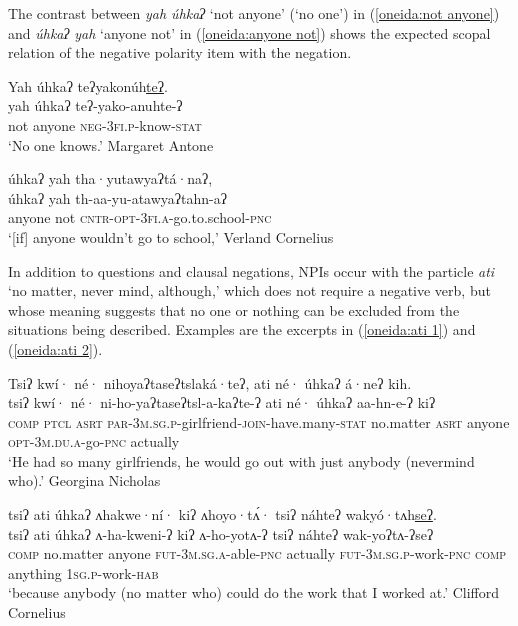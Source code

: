 \documentclass[output=paper,colorlinks,citecolor=brown]{langscibook}
\begin{document}
The contrast between \textit{yah úhkaʔ} `not anyone' (`no one') in (\ref{oneida:not anyone}) and \textit{úhkaʔ yah} `anyone not' in (\ref{oneida:anyone not}) shows the expected scopal relation of the negative polarity item with the negation.

\ea\label{oneida:not anyone}
    \glll Yah úhkaʔ teʔyakonúh\uline{teʔ}. \\
    yah úhkaʔ teʔ-yako-anuhte-ʔ \\
    not anyone \textsc{neg-3fi.p}-know-\textsc{stat} \\
    \glt `No one knows.' Margaret Antone \citep[177 (47)]{MichelsonEtAl2016}
\z

\ea\label{oneida:anyone not}
    \glll úhkaʔ yah tha·yutawyaʔtá·naʔ, \\
    úhkaʔ yah th-aa-yu-atawyaʔtahn-aʔ \\
    anyone not \textsc{cntr-opt-3fi.a}-go.to.school-\textsc{pnc} \\
    \glt `[if] anyone wouldn't go to school,' Verland Cornelius \citep[328 (160)]{MichelsonEtAl2016}
\z

In addition to questions and clausal negations, NPIs occur with the particle \textit{ati} `no matter, never mind, although,' which does not require a negative verb, but whose meaning suggests that no one or nothing can be excluded from the situations being described. Examples are the excerpts in (\ref{oneida:ati 1}) and (\ref{oneida:ati 2}).

\ea\label{oneida:ati 1}	
    \glll Tsiʔ kwí· né· nihoyaʔtaseʔtslaká·teʔ, ati né· úhkaʔ á·neʔ kih. \\
    tsiʔ kwí· né· ni-ho-yaʔtaseʔtsl-a-kaʔte-ʔ ati né· úhkaʔ aa-hn-e-ʔ kiʔ \\
    \textsc{comp} \textsc{ptcl} \textsc{asrt} \textsc{par-3m.sg.p}-girlfriend-\textsc{join}-have.many-\textsc{stat} {no.matter} \textsc{asrt} anyone \textsc{opt-3m.du.a}-go-\textsc{pnc} actually \\ 
    \glt `He had so many girlfriends, he would go out with just anybody (nevermind who).' Georgina Nicholas \citep[32 (6)]{MichelsonEtAl2016}
\z

\ea\label{oneida:ati 2}	
    \glll tsiʔ ati úhkaʔ ʌhakwe·ní· kiʔ ʌhoyo·tʌ́· tsiʔ náhteʔ waky\'o·tʌh\uline{seʔ}. \\
    tsiʔ ati úhkaʔ ʌ-ha-kweni-ʔ kiʔ ʌ-ho-yotʌ-ʔ tsiʔ náhteʔ wak-yo{ʔ}tʌ-{ʔ}seʔ \\
    \textsc{comp} {no.matter} anyone \textsc{fut-3m.sg.a}-able-\textsc{pnc} actually \textsc{fut-3m.sg.p}-work-\textsc{pnc} \textsc{comp} anything \textsc{1sg.p}-work-\textsc{hab}\\ 
    \glt `because anybody (no matter who) could do the work that I worked at.' Clifford Cornelius \citep[233 (101)]{MichelsonEtAl2016}
\z
\end{document}
